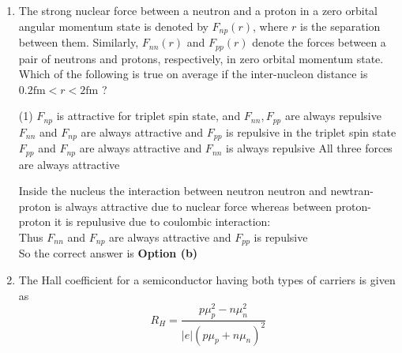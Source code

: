 \begin{enumerate}
\begin{tasks}
	\task[\textbf{c.}]an eigenstate of $\hat{x}$ corresponding to the eigenvalue $(x-a)$
	\task[\textbf{d.}] not an eigenstate of $\hat{x}$	
\end{tasks}
\begin{answer}
	\begin{align*}
	&e^{\frac{i a P}{\hbar}}|x\rangle\\
	&=\left[\sum_{n=0}^{\infty} \frac{1}{\lfloor n}\left(\frac{i a P}{\hbar}\right)^{n}\right]|x\rangle=\left[\sum_{n=0}^{\infty} \frac{1}{\lfloor n}(-a \nabla)^{n}\right]^{h}|x\rangle \\
	&=|x\rangle-a \vec{\nabla}|x\rangle+\frac{1}{\lfloor 2}(a \vec{\nabla})^{2}|x\rangle \ldots .=|x-a\rangle \\
	X|x-a\rangle&=(x-a)|x-a\rangle
	\end{align*}
		So the correct answer is \textbf{Option (c)}
\end{answer}
\item The strong nuclear force between a neutron and a proton in a zero orbital angular momentum state is denoted by $F_{n p}(r)$, where $r$ is the separation between them. Similarly, $F_{n n}(r)$ and $F_{p p}(r)$ denote the forces between a pair of neutrons and protons, respectively, in zero orbital momentum state. Which of the following is true on average if the inter-nucleon distance is $0.2 \mathrm{fm}<r<2 \mathrm{fm}$ ?
 \begin{tasks}(1)
	\task[\textbf{a.}]$F_{n p}$ is attractive for triplet spin state, and $F_{n n}, F_{p p}$ are always repulsive
	\task[\textbf{b.}]$F_{n n}$ and $F_{n p}$ are always attractive and $F_{p p}$ is repulsive in the triplet spin state
	\task[\textbf{c.}] $F_{p p}$ and $F_{n p}$ are always attractive and $F_{n n}$ is always repulsive
	\task[\textbf{d.}] All three forces are always attractive
\end{tasks}
\begin{answer}
	Inside the nucleus the interaction between neutron neutron and newtran-proton is always attractive due to nuclear force whereas between proton-proton it is repulusive due to coulombic interaction:\\
	Thus $F_{n n}$ and $F_{n p}$ are always attractive and $F_{p p}$ is repulsive\\
	So the correct answer is \textbf{Option (b)}
\end{answer}
\item The Hall coefficient for a semiconductor having both types of carriers is given as
$$
R_{H}=\frac{p \mu_{p}^{2}-n \mu_{n}^{2}}{|e|\left(p \mu_{p}+n \mu_{n}\right)^{2}}
$$
\end{enumerate}
